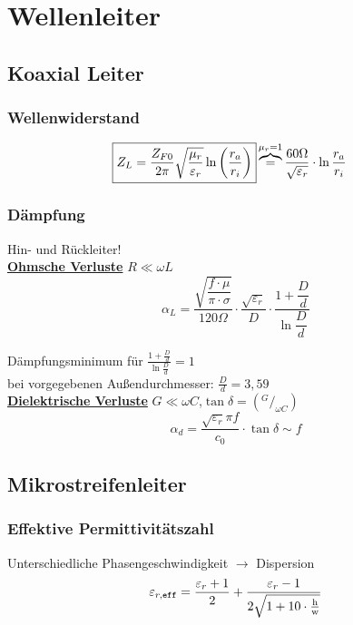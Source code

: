 \section{Wellenleiter}
\subsection{Koaxial Leiter}
\subsubsection{Wellenwiderstand}


\begin{align*}
    \Aboxed{Z_L &= \frac{Z_{F0}}{2\pi}\sqrt{\frac{\mu_r}{\varepsilon_r}}\ln\left( \frac{r_a}{r_i} \right)}  \overbrace{=}^{ \mu_r=1}\frac{60\Omega}{\sqrt{\varepsilon_r}}\cdot \ln{\frac{r_a}{r_i}}
\end{align*}

\subsubsection{Dämpfung}
Hin- und Rückleiter!\\
\underline{\textbf{Ohmsche Verluste}} $R\ll\omega L$
\[
    \alpha_L = \frac{\sqrt{\dfrac{f\cdot\mu}{\pi\cdot\sigma}}}{120\Omega}\cdot\frac{\sqrt{\varepsilon_r}}{D}\cdot\dfrac{1+\dfrac{D}{d}}{\ln \dfrac{D}{d}}
\]

Dämpfungsminimum für $ \frac{1+\tfrac{D}{d}}{\ln \tfrac{D}{d}} = 1 $\\ bei vorgegebenen Außendurchmesser: $ \frac{D}{d} =3,59 $\\

\underline{\textbf{Dielektrische Verluste}} $G\ll\omega C$,$\tan\delta= (^G/_{\omega C})$
\[
    \alpha_d = \frac{\sqrt{\varepsilon_r}\pi f}{c_0}\cdot\tan\delta \sim f
\]

\subsection{Mikrostreifenleiter}

\subsubsection{Effektive Permittivitätszahl}
Unterschiedliche Phasengeschwindigkeit $\rightarrow$ Dispersion
\[
         \varepsilon_{r,\texttt{eff}}  = \frac{\varepsilon_r+1}{2}+\frac{\varepsilon_r-1}{2\sqrt{1+10\cdot\frac{\text{h}}{\text{w}}}} \\
\]

